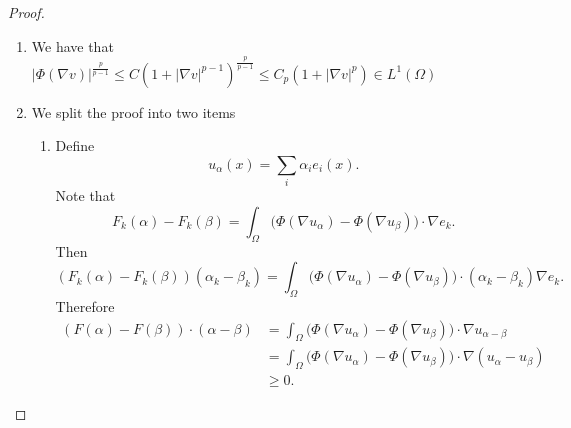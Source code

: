\begin{proof}
    \begin{enumerate}
        \item We have that $|\Phi( \nabla v) |^{\frac p {p-1}} \le C(1 + |\nabla v| ^{p-1}  )^{\frac p {p-1}} \le C_p (1  + |\nabla v|^{p} ) \in L^1 (\Omega)$

        \item We split the proof into two items
              \begin{enumerate}
                  \item
                        Define
                        $$
                            u_\alpha (x) = \sum_i \alpha_i e_i (x).
                        $$
                        Note that
                        $$
                            F_k(\alpha) - F_k(\beta) = \int_\Omega \Big ( \Phi\left(  \nabla u_\alpha   \right)  - \Phi( \nabla u_\beta) \Big) \cdot \nabla e_k.
                        $$
                        Then
                        $$
                            (F_k(\alpha) - F_k(\beta)) (\alpha_k - \beta_k ) = \int_\Omega \Big ( \Phi\left(  \nabla u_\alpha   \right)  - \Phi( \nabla u_\beta) \Big) \cdot (\alpha_k - \beta_k ) \nabla e_k.
                        $$
                        Therefore
                        $$
                            \begin{aligned}
                                (F(\alpha) - F(\beta)) \cdot (\alpha - \beta ) & = \int_\Omega \Big ( \Phi\left(  \nabla u_\alpha   \right)  - \Phi( \nabla u_\beta) \Big) \cdot \nabla u_{\alpha - \beta}       \\
                                                                               & = \int_\Omega \Big ( \Phi\left(  \nabla u_\alpha   \right)  - \Phi( \nabla u_\beta) \Big) \cdot \nabla (u_{\alpha} - u_{\beta}) \\
                                                                               & \ge 0.
                            \end{aligned}
                        $$


\end{enumerate}
\end{enumerate}
\end{proof}
